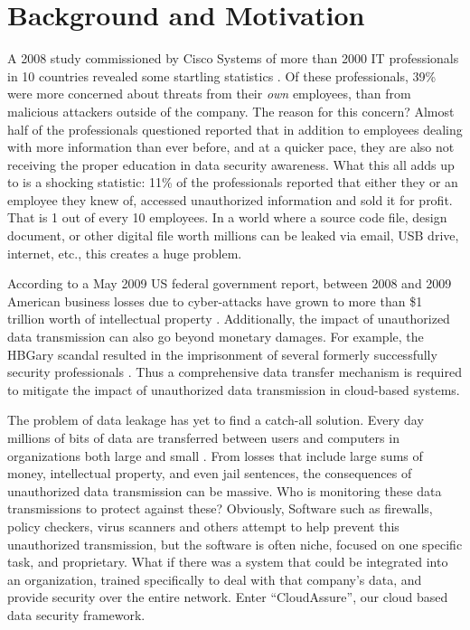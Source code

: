 






\section{Background and Motivation}
A 2008 study commissioned by Cisco Systems of more than 2000 IT professionals in
10 countries revealed some startling statistics \autocite{Cisco2008}. Of these professionals,
39\% were more concerned about threats from their \emph{own} employees, than from
malicious attackers outside of the company. The reason for this concern?
Almost half of the professionals questioned reported that in addition to
employees dealing with more information than ever before, and at a quicker
pace, they are also not receiving the proper education in data security
awareness. What this all adds up to is a shocking statistic: 11\% of the
professionals reported that either they or an employee they knew of, accessed
unauthorized information and sold it for profit. That is 1 out of every 10
employees. In a world where a source code file, design document, or other
digital file worth millions can be leaked via email, USB drive, internet,
etc., this creates a huge problem.  

According to a May 2009 US federal
government report, between 2008 and 2009 American business losses due to
cyber-attacks have grown to more than \$1 trillion worth of intellectual
property \autocite{Symantec2013}. Additionally, the impact of unauthorized data
transmission can also go beyond monetary damages. For example, the HBGary
scandal resulted in the
imprisonment of several formerly successfully security professionals
\autocite{Bright2012}.
Thus a comprehensive data transfer mechanism is required to mitigate the
impact of unauthorized data transmission in cloud-based systems.

The problem of data leakage has yet to find a catch-all solution. Every day
millions of bits of data are transferred between users and computers in
organizations both large and small \autocite{Bright2012}. From losses that
include large sums of money, intellectual property, and even jail
sentences, the consequences of unauthorized data transmission can be massive.
Who is monitoring these data transmissions to protect against these? Obviously,
Software such as firewalls, policy checkers, virus scanners and others attempt to help
prevent this unauthorized transmission, but the software is often niche, focused
on one specific task, and proprietary. What if there was a system that could be
integrated into an organization, trained specifically to deal with that company's
data, and provide security over the entire network. Enter ``CloudAssure'', our
cloud based data security framework. 

